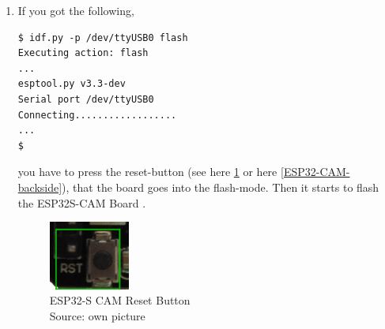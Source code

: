 \begin{enumerate}
\begin{lstlisting}[language=bash]
Crystal is 40MHz
MAC: 78:21:84:7d:01:78
Uploading stub...
Running stub...
Stub running...
Changing baud rate to 460800
Changed.
Configuring flash size...
Flash will be erased from 0x00001000 to 0x00007fff...
Flash will be erased from 0x00010000 to 0x00039fff...
Flash will be erased from 0x00008000 to 0x00008fff...
Compressed 25424 bytes to 15904...
Writing at 0x00001000... (100 %)
Wrote 25424 bytes (15904 compressed) at 0x00001000 in 0.8 seconds (effective 240.1 kbit/s)...
Hash of data verified.
Compressed 170048 bytes to 89645...
Writing at 0x00010000... (16 %)
Writing at 0x0001b0ec... (33 %)
Writing at 0x0002087d... (50 %)
Writing at 0x00026035... (66 %)
Writing at 0x0002e652... (83 %)
Writing at 0x00036a4a... (100 %)
Wrote 170048 bytes (89645 compressed) at 0x00010000 in 2.5 seconds (effective 552.7 kbit/s)...
Hash of data verified.
Compressed 3072 bytes to 103...
Writing at 0x00008000... (100 %)
Wrote 3072 bytes (103 compressed) at 0x00008000 in 0.1 seconds (effective 307.1 kbit/s)...
Hash of data verified.

Leaving...
Hard resetting via RTS pin...
Done
$
\end{lstlisting}
\item If you got the following,
\begin{lstlisting}
$ idf.py -p /dev/ttyUSB0 flash
Executing action: flash
...
esptool.py v3.3-dev
Serial port /dev/ttyUSB0
Connecting..................
...
$
\end{lstlisting}
you have to press the reset-button (see here \ref{ESP32-S-CAM-reset-button} or here \ref{ESP32-CAM-backside}), that the board goes into
the flash-mode. Then it starts to flash the ESP32S-CAM Board \cite{EspressifGetStartedGetESPIDF}.

\begin{figure}[H]
\centering
\includegraphics[width=0.25\textwidth]{reset_button}
\caption[ESP32-S-CAM Reset Button]{ESP32-S CAM Reset Button \\ Source: own picture}
\label{ESP32-S-CAM-reset-button}
\end{figure}

\end{enumerate}

